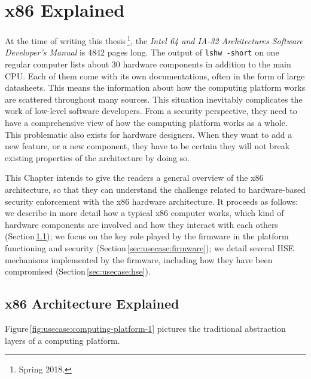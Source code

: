\chapter{x86 Explained}
\label{chapter:usecase}


At the time of writing this thesis\,\footnote{Spring 2018.}, the \emph{Intel 64
  and IA-32 Architectures Software Developer’s Manual} is 4842 pages long.
%
The output of \texttt{lshw -short} on one regular computer lists about 30
hardware components in addition to the main CPU.
%
Each of them come with its own documentations, often in the form of large
datasheets.
%
This means the information about how the computing platform works are scattered
throughout many sources.
%
This situation inevitably complicates the work of low-level software developers.
%
From a security perspective, they need to have a comprehensive view of how the
computing platform works as a whole.
%
This problematic also exists for hardware designers.
%
When they want to add a new feature, or a new component, they have to be certain
they will not break existing properties of the architecture by doing so.

This Chapter intends to give the readers a general overview of the x86
architecture, so that they can understand the challenge related to
hardware-based security enforcement with the x86 hardware architecture.
%
It proceeds as follows:
%
we describe in more detail how a typical x86 computer works, which kind of
hardware components are involved and how they interact with each others
(Section\,\ref{sec:usecase:architecture});
%
we focus on the key role played by the firmware in the platform functioning and
security (Section\,\ref{sec:usecase:firmware});
%
we detail several HSE mechanisms implemented by the firmware, including how they
have been compromised (Section\,\ref{sec:usecase:hse}).

\section{x86 Architecture Explained}
\label{sec:usecase:architecture}

Figure\,\ref{fig:usecase:computing-platform-1} pictures the traditional
abstraction layers of a computing platform.

